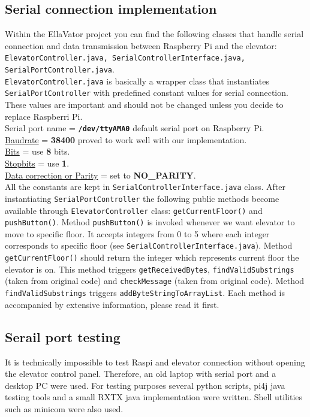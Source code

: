 \documentclass[a4paper, 12pt]{article}
\begin{document}
\subsection{Serial connection implementation}
Within the EllaVator project you can find the following classes that handle serial connection and data transmission between Raspberry Pi and the elevator: \texttt{ElevatorController.java, SerialControllerInterface.java, SerialPortController.java}.\\
\texttt{ElevatorController.java} is basically a wrapper class that instantiates \texttt{SerialPortController} with predefined constant values for serial connection.
These values are important and should not be changed unless you decide to replace Raspberri Pi.\\
Serial port name = \textbf{\texttt{/dev/ttyAMA0}} default serial port on Raspberry Pi.\\
\href{https://en.wikipedia.org/wiki/Serial\_port\#Speed}{Baudrate} = \textbf{38400} proved to work well with our implementation.\\
\href{https://en.wikipedia.org/wiki/Serial\_port\#Data_bits}{Bits} = use \textbf{8} bits.\\
\href{https://en.wikipedia.org/wiki/Serial\_port\#Stop_bits}{Stopbits} = use \textbf{1}.\\
\href{https://en.wikipedia.org/wiki/Serial\_port\#Parity}{Data correction or Parity} = set to \textbf{NO\_PARITY}.\\

All the constants are kept in \texttt{SerialControllerInterface.java} class.
After instantiating \texttt{SerialPortController} the following public methods become available through \texttt{ElevatorController} class: \texttt{getCurrentFloor()} and \texttt{pushButton()}.
Method \texttt{pushButton()} is invoked whenever we want elevator to move to specific floor.
It accepts integers from 0 to 5 where each integer corresponds to specific floor (see \texttt{SerialControllerInterface.java}).
Method \texttt{getCurrentFloor()} should return the integer which represents current floor the elevator is on.
This method triggers \texttt{getReceivedBytes}, \texttt{findValidSubstrings} (taken from original code) and \texttt{checkMessage} (taken from original code).
Method \texttt{findValidSubstrings} triggers \texttt{addByteStringToArrayList}.
Each method is accompanied by extensive information, please read it first.

\subsection{Serail port testing}
It is technically impossible to test Raspi and elevator connection without opening the elevator control panel.
Therefore, an old laptop with serial port and a desktop PC were used.
For testing purposes several python scripts, pi4j java testing tools and a small RXTX java implementation were written.
Shell utilities such as minicom were also used.
\\
\end{document}
